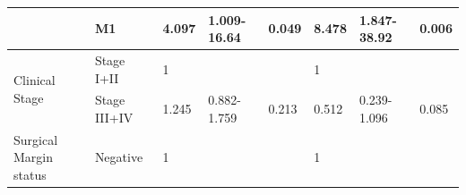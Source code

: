 \documentclass[cancers,article,submit,moreauthors,pdftex]{Definitions/mdpi}
\begin{document}
\begin{table}[!hp]
{\begin{tabular}{|l|l|l|l|l|l|l|l|}
\cline{2-8}
                                        & M1                                                                                  & 4.097                                                                          & 1.009-16.64                                                                   & \textcolor[rgb]{1,0.149,0}{0.049}                                             & 8.478                                                                          & 1.847-38.92                                                                   & \textcolor[rgb]{1,0.149,0}{0.006}                                              \\ 
\hline
\multirow{2}{*}{Clinical Stage}         & {\cellcolor[rgb]{0.62,0.812,0.878}}Stage I+II                                       & {\cellcolor[rgb]{0.62,0.812,0.878}}1                                           & {\cellcolor[rgb]{0.62,0.812,0.878}}                                           & {\cellcolor[rgb]{0.62,0.812,0.878}}                                           & {\cellcolor[rgb]{0.62,0.812,0.878}}1                                           & {\cellcolor[rgb]{0.62,0.812,0.878}}                                           & {\cellcolor[rgb]{0.62,0.812,0.878}}                                            \\ 
\cline{2-8}
                                        & Stage III+IV                                                                        & 1.245                                                                          & 0.882-1.759                                                                   & 0.213                                                                         & 0.512                                                                          & 0.239-1.096                                                                   & 0.085                                                                          \\ 
\hline
\multirow{2}{*}{Surgical Margin status} & {\cellcolor[rgb]{0.62,0.812,0.878}}Negative                                         & {\cellcolor[rgb]{0.62,0.812,0.878}}1                                           & {\cellcolor[rgb]{0.62,0.812,0.878}}                                           & {\cellcolor[rgb]{0.62,0.812,0.878}}                                           & {\cellcolor[rgb]{0.62,0.812,0.878}}1                                           & {\cellcolor[rgb]{0.62,0.812,0.878}}                                           & {\cellcolor[rgb]{0.62,0.812,0.878}}                                            \\ 

\end{tabular}}
\end{table}
\end{document}
